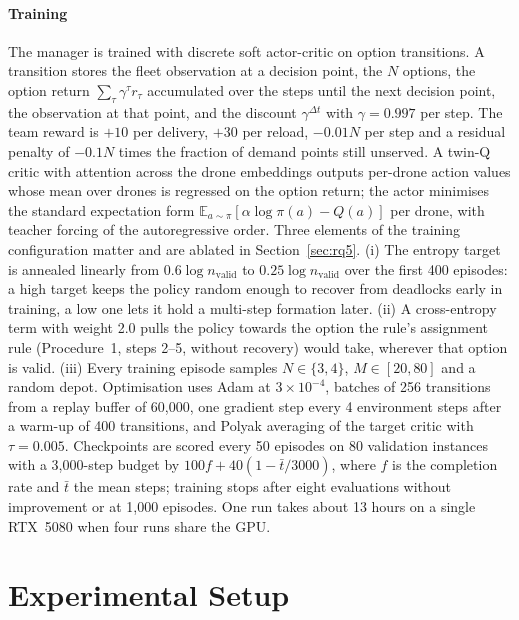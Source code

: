 \documentclass[final,5p,times,twocolumn]{elsarticle}
\begin{document}
\paragraph{Training}
The manager is trained with discrete soft actor-critic \cite{haarnoja2018} on option
transitions. A transition stores the fleet observation at a decision point, the $N$ options,
the option return $\sum_{\tau} \gamma^{\tau} r_{\tau}$ accumulated over the steps until the next
decision point, the observation at that point, and the discount $\gamma^{\Delta t}$ with
$\gamma = 0.997$ per step. The team reward is $+10$ per delivery, $+30$ per reload, $-0.01N$
per step and a residual penalty of $-0.1N$ times the fraction of demand points still unserved.
A twin-Q critic with attention across the drone embeddings outputs per-drone action values whose
mean over drones is regressed on the option return; the actor minimises the standard expectation
form $\mathbb{E}_{a \sim \pi}[\alpha \log \pi(a) - Q(a)]$ per drone, with teacher forcing of
the autoregressive order. Three elements of the training configuration matter and are ablated in
Section~\ref{sec:rq5}. (i) The entropy target is annealed linearly from $0.6 \log
n_{\mathrm{valid}}$ to $0.25 \log n_{\mathrm{valid}}$ over the first 400 episodes: a high
target keeps the policy random enough to recover from deadlocks early in training, a low one lets it
hold a multi-step formation later. (ii) A cross-entropy term with weight 2.0 pulls the policy
towards the option the rule's assignment rule (Procedure~1, steps 2--5, without recovery)
would take, wherever that option is valid. (iii) Every training episode samples $N \in
\{3,4\}$, $M \in [20,80]$ and a random depot. Optimisation uses Adam at $3 \times 10^{-4}$,
batches of 256 transitions from a replay buffer of 60{,}000, one gradient step every 4
environment steps after a warm-up of 400 transitions, and Polyak averaging of the target critic
with $\tau = 0.005$. Checkpoints are scored every 50 episodes on 80 validation instances with a
3{,}000-step budget by $100f + 40(1 - \bar t/3000)$, where $f$ is the completion rate and $\bar
t$ the mean steps; training stops after eight evaluations without improvement or at 1{,}000
episodes. One run takes about 13 hours on a single RTX~5080 when four runs share the GPU.

\section{Experimental Setup}
\label{sec:setup}
\end{document}
